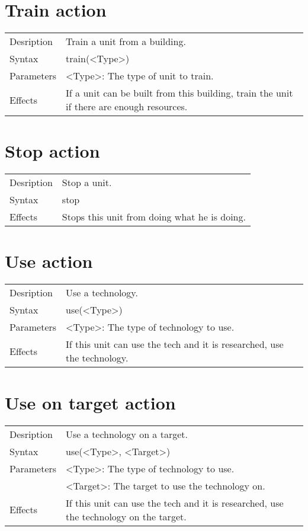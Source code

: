\documentclass[english,11pt]{report}
\begin{document}
\section{Train action}
\begin{tabularx}{\textwidth}{lX}
 Desription & Train a unit from a building. \\
 Syntax & train(<Type>) \\
 Parameters & <Type>: The type of unit to train.\\
 Effects &  If a unit can be built from this building, train the unit if there are enough resources.
\end{tabularx}

\section{Stop action}
\begin{tabularx}{\textwidth}{lX}
 Desription & Stop a unit. \\
 Syntax & stop \\
 Effects &  Stops this unit from doing what he is doing.
\end{tabularx}

\section{Use action}
\begin{tabularx}{\textwidth}{lX}
 Desription & Use a technology. \\
 Syntax & use(<Type>) \\
 Parameters & <Type>: The type of technology to use.\\
 Effects &  If this unit can use the tech and it is researched, use the technology.
\end{tabularx}

\section{Use on target action}
\begin{tabularx}{\textwidth}{lX}
 Desription & Use a technology on a target. \\
 Syntax & use(<Type>, <Target>) \\
 Parameters & <Type>: The type of technology to use.\\
            & <Target>: The target to use the technology on.\\
 Effects &  If this unit can use the tech and it is researched, use the technology on the target.
\end{tabularx}
\end{document}
